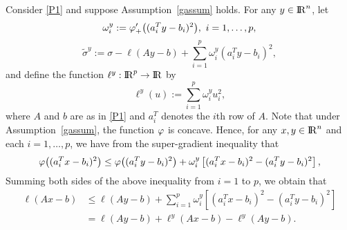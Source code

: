 \documentclass[10pt]{article}
\numberwithin{equation}{section}
\def\R{{\rm I\!R}}
\begin{document}
Consider \eqref{P1} and suppose Assumption~\ref{gassum} holds. For any $y\in\R^n$, let
\begin{equation}\label{defomega}
\omega_i^y := {\color{black} \varphi}_+'\big((a_i^T y - b_i)^2\big), ~i= 1,\ldots, p,
\end{equation}
\begin{equation}\label{defsigma}
\tilde{\sigma}^y := \sigma - \ell(Ay - b) + \sum_{i=1}^p \omega_i^y(a_i^Ty - b_i)^2,
\end{equation}
and define the function $\ell^y:\R^p\to \R$ by
\begin{equation}\label{defell}
\ell^y(u):= \sum_{i=1}^p \omega_i^yu_i^2,
\end{equation}
where $A$ and $b$ are as in \eqref{P1} and $a_i^T$ denotes the $i$th row of $A$.
Note that under Assumption~\ref{gassum}, the function ${\color{black} \varphi}$ is concave. Hence, for any $x,y\in\R^n$ and each $i=1,\ldots,p$, we have from the super-gradient inequality that
\[
{\color{black} \varphi}\big((a_i^T x - b_i)^2\big) \leq {\color{black} \varphi}\big((a_i^T y - b_i)^2\big) + \omega_i^y\left[(a_i^T x - b_i)^2 -(a_i^T y - b_i)^2\right],
\]
Summing both sides of the above inequality from $i=1$ to $p$, we obtain that
\begin{equation}\label{ell}
\begin{aligned}
\ell(Ax - b) &\leq \ell(Ay - b) + \sum_{i=1}^p \omega_i^y\left[(a_i^T x - b_i)^2 -(a_i^T y - b_i)^2\right]\\
& = \ell(Ay - b) + \ell^y(Ax - b) - \ell^y(Ay-b).
\end{aligned}
\end{equation}
\end{document}
